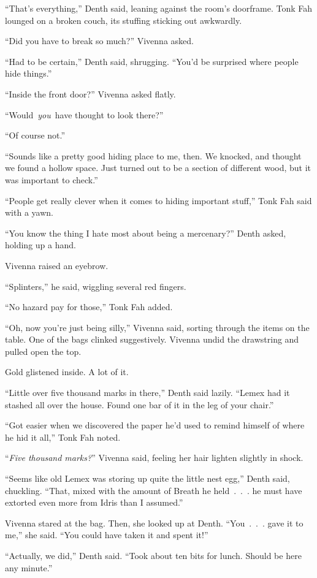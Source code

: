 “That’s everything,” Denth said, leaning against the room’s doorframe. Tonk Fah lounged on a broken couch, its stuffing sticking out awkwardly.

“Did you have to break so much?” Vivenna asked.

“Had to be certain,” Denth said, shrugging. “You’d be surprised where people hide things.”

“Inside the front door?” Vivenna asked flatly.

“Would~\textit{you}~have thought to look there?”

“Of course not.”

“Sounds like a pretty good hiding place to me, then. We knocked, and thought we found a hollow space. Just turned out to be a section of different wood, but it was important to check.”

“People get really clever when it comes to hiding important stuff,” Tonk Fah said with a yawn.

“You know the thing I hate most about being a mercenary?” Denth asked, holding up a hand.

Vivenna raised an eyebrow.

“Splinters,” he said, wiggling several red fingers.

“No hazard pay for those,” Tonk Fah added.

“Oh, now you’re just being silly,” Vivenna said, sorting through the items on the table. One of the bags clinked suggestively. Vivenna undid the drawstring and pulled open the top.

Gold glistened inside. A lot of it.

“Little over five thousand marks in there,” Denth said lazily. “Lemex had it stashed all over the house. Found one bar of it in the leg of your chair.”

“Got easier when we discovered the paper he’d used to remind himself of where he hid it all,” Tonk Fah noted.

“\textit{Five thousand marks?}” Vivenna said, feeling her hair lighten slightly in shock.

“Seems like old Lemex was storing up quite the little nest egg,” Denth said, chuckling. “That, mixed with the amount of Breath he held~.~.~. he must have extorted even more from Idris than I assumed.”

Vivenna stared at the bag. Then, she looked up at Denth. “You~.~.~. gave it to me,” she said. “You could have taken it and spent it!”

“Actually, we did,” Denth said. “Took about ten bits for lunch. Should be here any minute.”

